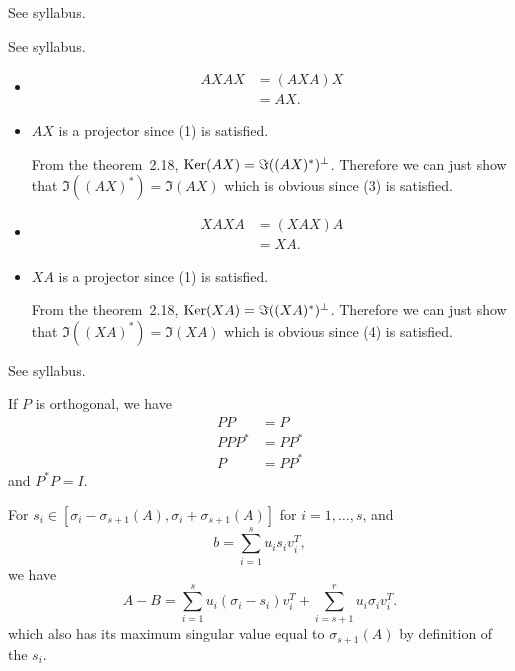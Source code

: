 \begin{solution}
  See syllabus.
\end{solution}

\begin{solution}
  See syllabus.
\end{solution}

\begin{solution}
  \begin{itemize}
    \item
      \begin{align*}
        AXAX
        & = (AXA)X\\
        & = AX.
      \end{align*}
    \item
      $AX$ is a projector since (1) is satisfied.

      From the theorem~2.18, $\operatorname{Ker}(AX) = \Im((AX)^*)^\perp$.
      Therefore we can just show that $\Im((AX)^*) = \Im(AX)$ which is obvious
      since (3) is satisfied.
    \item
      \begin{align*}
        XAXA
        & = (XAX)A\\
        & = XA.
      \end{align*}
    \item
      $XA$ is a projector since (1) is satisfied.

      From the theorem~2.18, $\operatorname{Ker}(XA) = \Im((XA)^*)^\perp$.
      Therefore we can just show that $\Im((XA)^*) = \Im(XA)$ which is obvious
      since (4) is satisfied.
  \end{itemize}
\end{solution}

\begin{solution}
  See syllabus.

  If $P$ is orthogonal, we have
  \begin{align*}
    PP & = P\\
    PPP^* & = PP^*\\
    P & = PP^*
  \end{align*}
  and $P^*P = I$.
\end{solution}

\nosolution

\nosolution

\begin{solution}
  For $s_i \in [\sigma_i - \sigma_{s+1}(A), \sigma_i + \sigma_{s+1}(A)]$ for $i = 1, \ldots, s$,
  and
  \[ b = \sum_{i=1}^s u_i s_i v_i^T, \]
  we have
  \[ A - B = \sum_{i=1}^s u_i(\sigma_i - s_i)v_i^T + \sum_{i=s+1}^r u_i\sigma_iv_i^T. \]
  which also has its maximum singular value equal to $\sigma_{s+1}(A)$ by definition of the $s_i$.
\end{solution}
